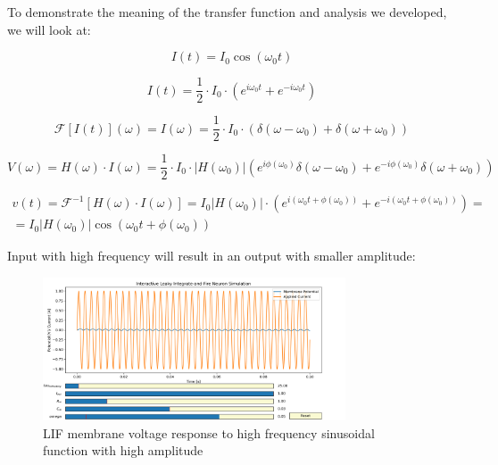 To demonstrate the meaning of the transfer function and analysis we developed, we will look at:

\begin{equation}
    I(t) = I_0 \cos(\omega_0 t)
\end{equation}

\begin{equation}
    I(t) = \frac{1}{2} \cdot I_0 \cdot \left(e^{i\omega_0 t} + e^{-i\omega_0 t}\right)
\end{equation}

\begin{equation}
    \mathcal{F}[I(t)](\omega) = I(\omega) = \frac{1}{2} \cdot I_0 \cdot \left(\delta(\omega - \omega_0) + \delta(\omega + \omega_0)\right)
\end{equation}

\begin{equation}
    V(\omega) = H(\omega) \cdot I(\omega) = \frac{1}{2}  \cdot I_0 \cdot |H(\omega_0)| \left(e^{i\phi(\omega_0)} \delta(\omega - \omega_0) + e^{-i\phi(\omega_0)} \delta(\omega + \omega_0)\right)
\end{equation}

\begin{equation}
\begin{aligned}
    v(t) = \mathcal{F}^{-1}[H(\omega) \cdot I(\omega)] = I_0 |H(\omega_0)| \cdot \left(e^{i(\omega_0 t + \phi(\omega_0))} + e^{-i(\omega_0 t + \phi(\omega_0))}\right) = \\ = I_0 |H(\omega_0)| \cos(\omega_0 t + \phi(\omega_0))
\end{aligned}
\end{equation}

Input with high frequency will result in an output with smaller amplitude:

\begin{figure}[H]
    \centering
    \includegraphics[width=0.8\textwidth]{methods/computational-models/graphs/LIF-high-freq-sin-response.png}
    \caption{LIF membrane voltage response to high frequency sinusoidal function with high amplitude}
    \label{fig:LIF-high-freq-sin}
\end{figure}

